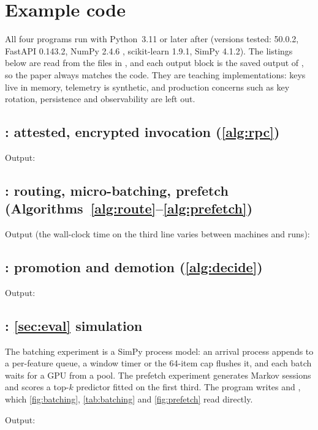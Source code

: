 \section{Example code}\label{app:code}

All four programs run with Python~3.11 or later after
(versions tested:  50.0.2, FastAPI 0.143.2, NumPy 2.4.6
\cite{harris2020numpy}, scikit-learn 1.9.1, SimPy 4.1.2). The listings below are read from
the files in , and each output block is the saved output of
, so the paper always matches the code. They are teaching
implementations: keys live in memory, telemetry is synthetic, and production concerns such as
key rotation, persistence and observability are left out.

\subsection{\texorpdfstring{}{attested\_rpc.py}: attested, encrypted invocation (\texorpdfstring{\cref{alg:rpc}}{Algorithm 1})}\label{app:rpc}

\noindent Output:


\subsection{\texorpdfstring{}{orchestrator.py}: routing, micro-batching, prefetch (Algorithms~\ref*{alg:route}--\ref*{alg:prefetch})}\label{app:orch}

\noindent Output (the wall-clock time on the third line varies between machines and runs):


\subsection{\texorpdfstring{}{lifecycle.py}: promotion and demotion (\texorpdfstring{\cref{alg:decide}}{Algorithm 5})}\label{app:lifecycle}

\noindent Output:


\subsection{\texorpdfstring{}{simulate.py}: \texorpdfstring{\cref{sec:eval}}{Section 8} simulation}\label{app:simulate}
The batching experiment is a SimPy process model: an arrival process appends to a per-feature
queue, a window timer or the 64-item cap flushes it, and each batch waits for a GPU from a
 pool. The prefetch experiment generates Markov sessions and scores a
top-\(k\) predictor fitted on the first third. The program writes
 and , which \cref{fig:batching},
\cref{tab:batching} and \cref{fig:prefetch} read directly.

\noindent Output:


